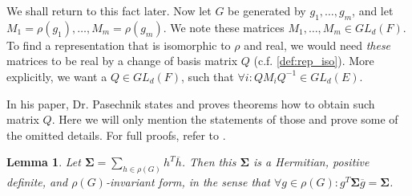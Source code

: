 \documentclass[11pt]{article}
\newtheorem{lemma}[theorem]{Lemma}
\begin{document}
We shall return to this fact later. Now let $G$ be generated by $g_1, \ldots, g_m$, and let $M_1 = \rho(g_1), \ldots, M_m = \rho(g_m)$.
We note these matrices $M_1, \ldots, M_m \in GL_d(F)$. To find a representation that is isomorphic to
$\rho$ and real, we would need \textit{these} matrices to be real by a change of basis matrix $Q$ (c.f. \cref{def:rep_iso}).
More explicitly, we want a $Q \in GL_d(F)$, such that $\forall i: QM_iQ^{-1} \in GL_d(E)$.

In his paper, Dr. Pasechnik states and proves theorems how to obtain such matrix $Q$.
Here we will only mention the statements of those and prove some of the omitted details. For full proofs, refer to \cite[Lemma 3.1, 3.2]{Pas21}.
\begin{lemma}
  Let $\mathbf{\Sigma} = \sum_{h \in \rho(G)} h^T\overline{h}$. Then this $\mathbf{\Sigma}$ is a Hermitian,
  positive definite, and $\rho(G)$-invariant form, in the sense that
  $\forall g \in \rho(G): g^T\mathbf{\Sigma}\overline{g} = \mathbf{\Sigma}$.
\end{lemma}
\end{document}
